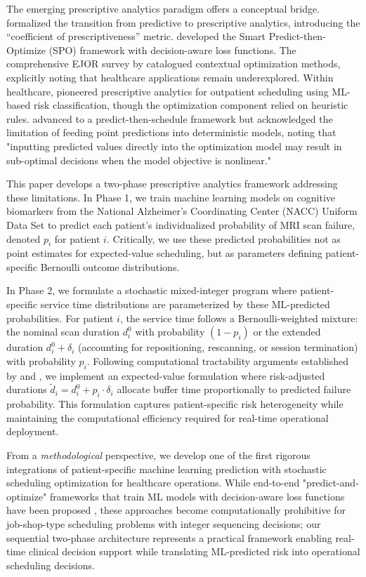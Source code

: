 The emerging prescriptive analytics paradigm offers a conceptual bridge. \citet{bertsimas2020predictive} formalized the transition from predictive to prescriptive analytics, introducing the ``coefficient of prescriptiveness'' metric. \citet{elmachtoub2022smart} developed the Smart Predict-then-Optimize (SPO) framework with decision-aware loss functions. The comprehensive EJOR survey by \citet{sadana2025contextual} catalogued contextual optimization methods, explicitly noting that healthcare applications remain underexplored. Within healthcare, \citet{srinivas2018prescriptive} pioneered prescriptive analytics for outpatient scheduling using ML-based risk classification, though the optimization component relied on heuristic rules. \citet{salah2022predict} advanced to a predict-then-schedule framework but acknowledged the limitation of feeding point predictions into deterministic models, noting that "inputting predicted values directly into the optimization model may result in sub-optimal decisions when the model objective is nonlinear."

This paper develops a two-phase prescriptive analytics framework addressing these limitations. In Phase 1, we train machine learning models on cognitive biomarkers from the National Alzheimer's Coordinating Center (NACC) Uniform Data Set to predict each patient's individualized probability of MRI scan failure, denoted $p_i$ for patient $i$. Critically, we use these predicted probabilities not as point estimates for expected-value scheduling, but as parameters defining patient-specific Bernoulli outcome distributions.

In Phase 2, we formulate a stochastic mixed-integer program where patient-specific service time distributions are parameterized by these ML-predicted probabilities. For patient $i$, the service time follows a Bernoulli-weighted mixture: the nominal scan duration $d_i^0$ with probability $(1-p_i)$ or the extended duration $d_i^0 + \delta_i$ (accounting for repositioning, rescanning, or session termination) with probability $p_i$. Following computational tractability arguments established by \citet{denton2003sequential} and \citet{mancilla2012sample}, we implement an expected-value formulation where risk-adjusted durations $\tilde{d}_i = d_i^0 + p_i \cdot \delta_i$ allocate buffer time proportionally to predicted failure probability. This formulation captures patient-specific risk heterogeneity while maintaining the computational efficiency required for real-time operational deployment.

From a \textit{methodological} perspective, we develop one of the first rigorous integrations of patient-specific machine learning prediction with stochastic scheduling optimization for healthcare operations. While end-to-end "predict-and-optimize" frameworks that train ML models with decision-aware loss functions have been proposed \citep{elmachtoub2022smart, mandi2024decision}, these approaches become computationally prohibitive for job-shop-type scheduling problems with integer sequencing decisions; our sequential two-phase architecture represents a practical framework enabling real-time clinical decision support while translating ML-predicted risk into operational scheduling decisions.

